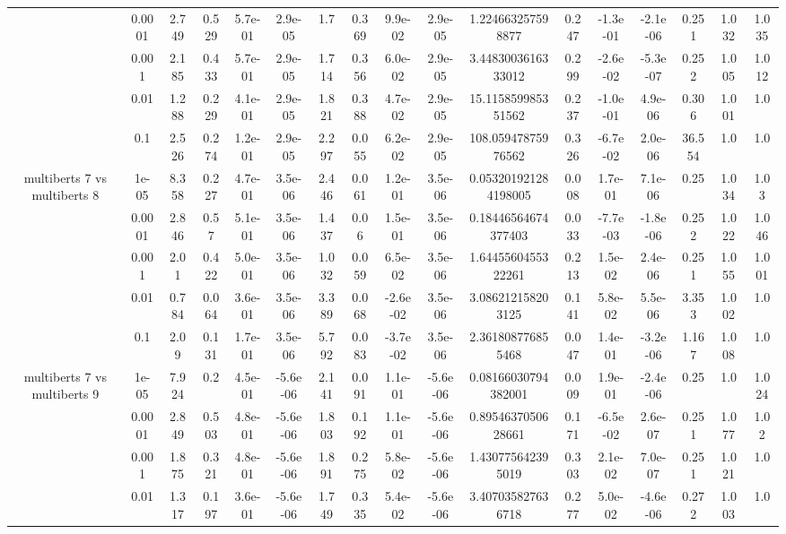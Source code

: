 \begin{tabular}{|c|c|c|c|c|c|c|c|c|c|c|c|c|c|c|c|c|}
 & 0.0001 & 2.749 & 0.529 & 5.7e-01 & 2.9e-05 & 1.7 & 0.369 & 9.9e-02 & 2.9e-05 & 1.224663257598877 & 0.247 & -1.3e-01 & -2.1e-06 & 0.251 & 1.032 & 1.035 \\
 & 0.001 & 2.185 & 0.433 & 5.7e-01 & 2.9e-05 & 1.714 & 0.356 & 6.0e-02 & 2.9e-05 & 3.4483003616333012 & 0.299 & -2.6e-02 & -5.3e-07 & 0.252 & 1.005 & 1.012 \\
 & 0.01 & 1.288 & 0.229 & 4.1e-01 & 2.9e-05 & 1.821 & 0.388 & 4.7e-02 & 2.9e-05 & 15.115859985351562 & 0.237 & -1.0e-01 & 4.9e-06 & 0.306 & 1.001 & 1.0 \\
 & 0.1 & 2.526 & 0.274 & 1.2e-01 & 2.9e-05 & 2.297 & 0.055 & 6.2e-02 & 2.9e-05 & 108.05947875976562 & 0.326 & -6.7e-02 & 2.0e-06 & 36.554 & 1.0 & 1.0 \\
\hline
\multirow{5}{*}{multiberts 7 vs multiberts 8} & 1e-05 & 8.358 & 0.227 & 4.7e-01 & 3.5e-06 & 2.446 & 0.061 & 1.2e-01 & 3.5e-06 & 0.053201921284198005 & 0.008 & 1.7e-01 & 7.1e-06 & 0.25 & 1.034 & 1.03 \\
 & 0.0001 & 2.846 & 0.57 & 5.1e-01 & 3.5e-06 & 1.437 & 0.06 & 1.5e-01 & 3.5e-06 & 0.18446564674377403 & 0.033 & -7.7e-03 & -1.8e-06 & 0.252 & 1.022 & 1.046 \\
 & 0.001 & 2.01 & 0.422 & 5.0e-01 & 3.5e-06 & 1.032 & 0.059 & 6.5e-02 & 3.5e-06 & 1.6445560455322261 & 0.213 & 1.5e-02 & 2.4e-06 & 0.251 & 1.055 & 1.001 \\
 & 0.01 & 0.784 & 0.064 & 3.6e-01 & 3.5e-06 & 3.389 & 0.068 & -2.6e-02 & 3.5e-06 & 3.086212158203125 & 0.141 & 5.8e-02 & 5.5e-06 & 3.353 & 1.002 & 1.0 \\
 & 0.1 & 2.09 & 0.131 & 1.7e-01 & 3.5e-06 & 5.792 & 0.083 & -3.7e-02 & 3.5e-06 & 2.361808776855468 & 0.047 & 1.4e-01 & -3.2e-06 & 1.167 & 1.008 & 1.0 \\
\hline
\multirow{5}{*}{multiberts 7 vs multiberts 9} & 1e-05 & 7.924 & 0.2 & 4.5e-01 & -5.6e-06 & 2.141 & 0.091 & 1.1e-01 & -5.6e-06 & 0.08166030794382001 & 0.009 & 1.9e-01 & -2.4e-06 & 0.25 & 1.0 & 1.024 \\
 & 0.0001 & 2.849 & 0.503 & 4.8e-01 & -5.6e-06 & 1.803 & 0.192 & 1.1e-01 & -5.6e-06 & 0.8954637050628661 & 0.171 & -6.5e-02 & 2.6e-07 & 0.251 & 1.077 & 1.02 \\
 & 0.001 & 1.875 & 0.321 & 4.8e-01 & -5.6e-06 & 1.891 & 0.275 & 5.8e-02 & -5.6e-06 & 1.430775642395019 & 0.303 & 2.1e-02 & 7.0e-07 & 0.251 & 1.021 & 1.0 \\
 & 0.01 & 1.317 & 0.197 & 3.6e-01 & -5.6e-06 & 1.749 & 0.335 & 5.4e-02 & -5.6e-06 & 3.407035827636718 & 0.277 & 5.0e-02 & -4.6e-06 & 0.272 & 1.003 & 1.0 \\

\end{tabular}
